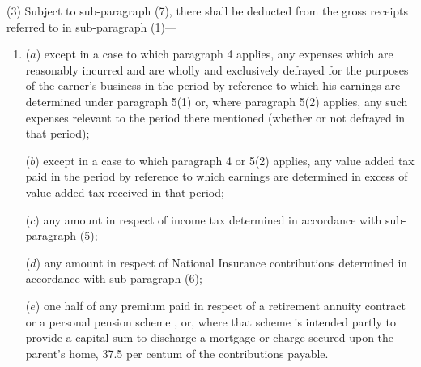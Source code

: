\documentclass[12pt,a4paper]{article}
\begin{document}
(3) 
Subject to sub-paragraph (7), %
there shall be deducted from the gross receipts referred to in sub-paragraph (1)—
\begin{enumerate}\item[]
($a$) 
except in a case to which paragraph 4 applies, %
any expenses which are reasonably incurred and are wholly and exclusively defrayed for the purposes of the earner’s business in the period by reference to which his earnings are determined under paragraph 5(1) or, where paragraph 5(2) applies, any such expenses relevant to the period there mentioned (whether or not defrayed in that period);

($b$) 
except in a case to which paragraph 4 
  or 5(2)  %
applies, %
any value added tax paid in the period by reference to which earnings are determined in excess of value added tax received in that period;

($c$) any amount in respect of income tax determined in accordance with sub-paragraph (5);

($d$) any amount in respect of National Insurance contributions determined in accordance with sub-paragraph (6);

($e$) one half of any premium paid in respect of a retirement annuity contract or a personal pension scheme%
, or, where that scheme is intended partly to provide a capital sum to discharge a mortgage or charge secured upon the parent’s home, 37.5 per centum of the contributions payable. %
\end{enumerate}
\end{document}
